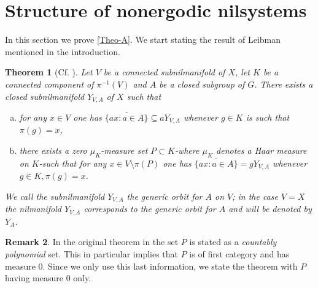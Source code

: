 \documentclass[letter, 11pt]{article}
\newtheorem{theorem}{Theorem}[section]
\theoremstyle{definition}
\newtheorem{remark}[theorem]{Remark}
\theoremstyle{plain}
\newcommand{\1}{\mathbbm{1}}
\begin{document}
\section{Structure of nonergodic nilsystems}
In this section we prove \cref{Theo-A}. We start stating the result of Leibman mentioned in the introduction.
\begin{theorem}[{Cf. \cite[Theorem 2.2]{Leibman03}}]\label{theo2.2L}
    Let $V$ be a connected subnilmanifold of $X$, let $K$ be a connected component of $\pi^{-1}(V)$ and $A$ be a closed subgroup of $G$. There exists a closed subnilmanifold $Y_{V, A}$ of $X$ such that

    \begin{enumerate}[(a)]
        \item for any $x \in V$ one has $\overline{\{ax : a\in A\}} \subseteq a Y_{V, A}$ whenever $g \in K$ is such that $ \pi(g)=x$,
        \item  there exists a zero $\mu_K$-measure set $P \subset K$-where $\mu_K$ denotes a Haar measure on $K$-such that for any $x \in V\setminus \pi(P)$ one has $\overline{\{ax : a\in A\}} =g Y_{V, A}$ whenever $g \in K, \pi(g)=x$.

    \end{enumerate}
We call the subnilmanifold $Y_{V, A}$ the generic orbit for $A$ on $V$; in the case $V=X$ the nilmanifold $Y_{V, A}$ corresponds to the generic orbit for $A$ and will be denoted by $Y_A$.
\end{theorem}
   \begin{remark}
        In the original theorem in \cite{Leibman03} the set $P$ is stated as a \textit{countably polynomial} set. This in particular implies that $P$ is of first category and has measure $0$. Since we only use this last information, we state the theorem with $P$ having measure $0$ only. 
    \end{remark}
    
\end{document}
